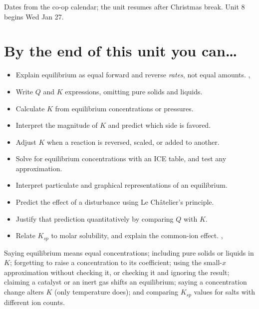 \documentclass{apchem-worksheet}
\begin{document}
{\sffamily\footnotesize Dates from the co-op calendar; the unit resumes
after Christmas break. Unit 8 begins Wed Jan 27.}

\vspace{0.5em}
\section*{\sffamily By the end of this unit you can\ldots}

\begin{itemize}[leftmargin=*,itemsep=0.12em]
  \item Explain equilibrium as equal forward and reverse \emph{rates}, not
        equal amounts. , 
  \item Write $Q$ and $K$ expressions, omitting pure solids and liquids.
  \item Calculate $K$ from equilibrium concentrations or pressures.
  \item Interpret the magnitude of $K$ and predict which side is favored.
  \item Adjust $K$ when a reaction is reversed, scaled, or added to
        another. 
  \item Solve for equilibrium concentrations with an ICE table, and test
        any approximation. 
  \item Interpret particulate and graphical representations of an
        equilibrium. 
  \item Predict the effect of a disturbance using Le Ch\^atelier's
        principle. 
  \item Justify that prediction quantitatively by comparing $Q$ with $K$.
  \item Relate $K_{sp}$ to molar solubility, and explain the common-ion
        effect. , 
\end{itemize}

\begin{apctrap}
Saying equilibrium means equal concentrations; including pure solids or
liquids in $K$; forgetting to raise a concentration to its coefficient;
using the small-$x$ approximation without checking it, or checking it and
ignoring the result; claiming a catalyst or an inert gas shifts an
equilibrium; saying a concentration change alters $K$ (only temperature
does); and comparing $K_{sp}$ values for salts with different ion counts.
\end{apctrap}
\end{document}
